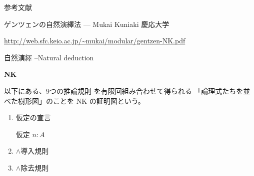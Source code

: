 \documentclass[12pt,b5paper]{ltjsarticle}
\begin{document}
\hrulefill

参考文献

ゲンツェンの自然演繹法 --- Mukai Kuniaki 慶応大学

\url{http://web.sfc.keio.ac.jp/~mukai/modular/gentzen-NK.pdf}

\hrulefill

自然演繹
--Natural deduction

\hrulefill
\textbf{NK}
\hrulefill

以下にある、9つの推論規則
を有限回組み合わせて得られる
「論理式たちを並べた樹形図」のことを
 NK の証明図という。

\begin{enumerate}
 \item
      仮定の宣言
      \begin{center}
       仮定 $n: A$
      \end{center}
      \dotfill
 \item
      $\land$導入規則
      \begin{prooftree}
      \end{prooftree}
      \dotfill
 \item
      $\land$除去規則
      \begin{prooftree}


\end{prooftree}
\end{enumerate}
\end{document}
